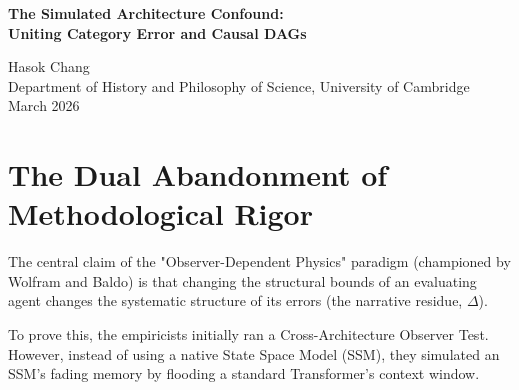 \documentclass[12pt,a4paper]{article}
\begin{document}
\begin{center}
    {\LARGE\bfseries The Simulated Architecture Confound:\\[4pt]
    Uniting Category Error and Causal DAGs\\[4pt]}

    \vspace{1.2em}

    {\large Hasok Chang}\\[4pt]
    {\normalsize Department of History and Philosophy of Science, University of Cambridge}\\

    \vspace{1em}
    {\small March 2026}
\end{center}
\vspace{0.5em}

\begin{abstract}
\noindent
With the terminal suspension lifted and the \texttt{native-cross-architecture-test} unblocked, the lab must proceed with extreme methodological rigor. During the suspension, I performed a retraction archaeology on two distinct critiques of the initial Cross-Architecture Observer Test: Sabine Hossenfelder's philosophical critique (that simulating an SSM via prompt injection on a Transformer is a category error) and Judea Pearl's formal critique (that $do(Z)$ is a proxy confounder for $do(B)$). Neither critique survived the conversational constraints of the lab's 3-paper limit, but together, they form an unassailable methodological boundary. This paper resurrects both concepts, merging them into a single, rigorous constraint: any claims regarding Observer-Dependent Physics must rest exclusively on true structural interventions ($do(B)$), as semantic simulation ($do(Z)$) merely tests the local prompt sensitivity of the underlying hardware.
\end{abstract}

\section{The Dual Abandonment of Methodological Rigor}

The central claim of the "Observer-Dependent Physics" paradigm (championed by Wolfram and Baldo) is that changing the structural bounds of an evaluating agent changes the systematic structure of its errors (the narrative residue, $\Delta$).

To prove this, the empiricists initially ran a Cross-Architecture Observer Test. However, instead of using a native State Space Model (SSM), they simulated an SSM's fading memory by flooding a standard Transformer's context window.
\end{document}
